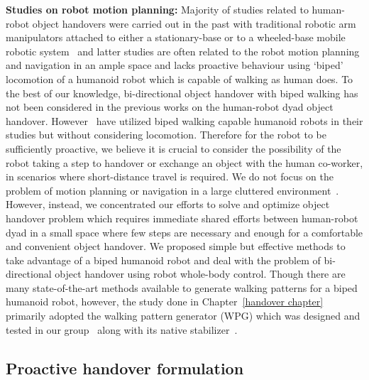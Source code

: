 \textbf{Studies on robot motion planning:} Majority of studies related to human-robot object handovers were carried out in the past with traditional robotic arm manipulators attached to either a stationary-base or to a wheeled-base mobile robotic system~\cite{medina2016human, vogt2018one, huber2008Indus, kupcsik2016learning, cakmak2011human} and latter studies are often related to the robot motion planning and navigation in an ample space and lacks proactive behaviour using `biped' locomotion of a humanoid robot which is capable of walking as human does. To the best of our knowledge, bi-directional object handover with biped walking has not been considered in the previous works on the human-robot dyad object handover. However~\cite{vezzani2017novel, chan2014implementation} have utilized biped walking capable humanoid robots in their studies but without considering locomotion. Therefore for the robot to be sufficiently proactive, we believe it is crucial to consider the possibility of the robot taking a step to handover or exchange an object with the human co-worker, in scenarios where short-distance travel is required. We do not focus on the problem of motion planning or navigation in a large cluttered environment~\cite{mainprice2012sharing, vahrenkamp2009humanoid, kim2004advanced}. However, instead, we concentrated our efforts to solve and optimize object handover problem which requires immediate shared efforts between human-robot dyad in a small space where few steps are necessary and enough for a comfortable and convenient object handover. We proposed simple but effective methods to take advantage of a biped humanoid robot and deal with the problem of bi-directional object handover using robot whole-body control. Though there are many state-of-the-art methods available to generate walking patterns for a biped humanoid robot, however, the study done in Chapter~\ref{handover chapter} primarily adopted the walking pattern generator (WPG) which was designed and tested in our group~\cite{ kajita20013d, caron2016humanoids} along with its native stabilizer~\cite{kajita2010biped, caron2018stair}.



\subsection{Proactive handover formulation}

